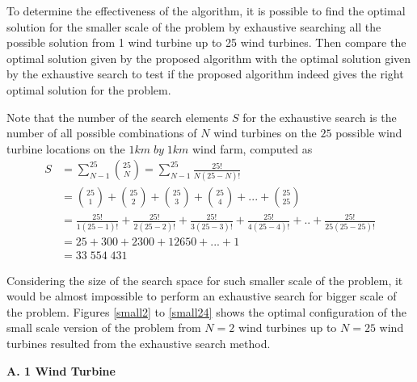    To determine the effectiveness of the algorithm, it is possible to find the optimal solution for the smaller scale of the problem by exhaustive searching all the possible solution from 1 wind turbine up to 25 wind turbines. Then compare the optimal solution given by the proposed algorithm with the optimal solution given by the exhaustive search to test if the proposed algorithm indeed gives the right optimal solution for the problem.
    
    Note that the number of the search elements $S$ for the exhaustive search is the number of all possible combinations of $N$ wind turbines on the $25$ possible wind turbine locations on the $1km\;by\;1km$ wind farm, computed as
    \begin{align*}
        S
        &= \sum_{N-1}^{25}\binom{25}{N} = \sum_{N-1}^{25}\frac{25!}{N(25-N)!} \\
        &= \binom{25}{1} + \binom{25}{2} + \binom{25}{3} + \binom{25}{4} +...+ \binom{25}{25} \\
        &= \frac{25!}{1(25-1)!} + \frac{25!}{2(25-2)!} + \frac{25!}{3(25-3)!} + \frac{25!}{4(25-4)!} +..+ \frac{25!}{25(25-25)!} \\
        &= 25+300+2300+12650+...+1 \\
        &= 33\;554\;431
    \end{align*}
    
    Considering the size of the search space for such smaller scale of the problem, it would be almost impossible to perform an exhaustive search for bigger scale of the problem. Figures \ref{small2} to \ref{small24} shows the optimal configuration of the small scale version of the problem from $N=2$ wind turbines up to $N=25$ wind turbines resulted from the exhaustive search method.
    
    \textbf{A. 1 Wind Turbine}
    
